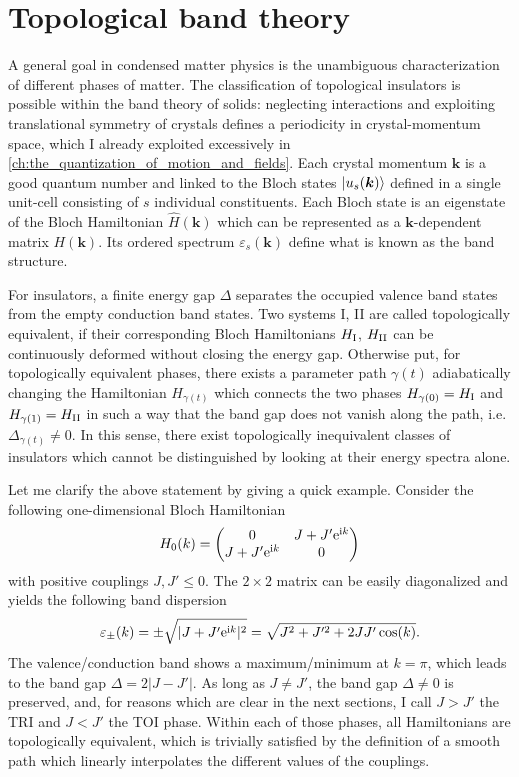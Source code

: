 \section{Topological band theory}
\label{sec:topological_band_theory}
%
%
A general goal in condensed matter physics is the unambiguous characterization of different phases of matter.
The classification of topological insulators is possible within the band theory of solids: neglecting interactions and exploiting translational symmetry of crystals defines a periodicity in crystal-momentum space, which I already exploited excessively in \cref{ch:the_quantization_of_motion_and_fields}.
Each crystal momentum ${\bm k}$ is a good quantum number and linked to the Bloch states $\ket{u_s(\bm k)}$ defined in a single unit-cell consisting of $s$ individual constituents.
Each Bloch state is an eigenstate of the Bloch Hamiltonian $\hat H(\bm k)$ which can be represented as a $\bm k$-dependent matrix $H(\bm k)$.
Its ordered spectrum $\varepsilon_s(\bm k)$ define what is known as the band structure.

For insulators, a finite energy gap $\Delta$ separates the occupied valence band states from the empty conduction band states.
Two systems I, II are called topologically equivalent, if their corresponding Bloch Hamiltonians $H_{\rm I}$, $H_{\rm II}$ can be continuously deformed without closing the energy gap.
Otherwise put, for topologically equivalent phases, there exists a parameter path $\gamma(t)$ adiabatically changing the Hamiltonian $H_{\gamma(t)}$ which connects the two phases $H_{\gamma(0)}=H_{\rm I}$ and $H_{\gamma(1)}=H_{\rm II}$ in such a way that the band gap does not vanish along the path, i.e. $\Delta_{\gamma(t)}\neq0$.
In this sense, there exist topologically inequivalent classes of insulators which cannot be distinguished by looking at their energy spectra alone.

Let me clarify the above statement by giving a quick example.
Consider the following one-dimensional Bloch Hamiltonian
\begin{align}
    H_0(k)
    =
    \begin{pmatrix}
        0 & J+J'\mathrm e^{\mathrm i k}\\
        J+J'\mathrm e^{\mathrm i k} & 0
    \end{pmatrix}
\end{align}
with positive couplings $J,J'\leq0$.
The $2\times2$ matrix can be easily diagonalized and yields the following band dispersion
\begin{align}
    \varepsilon_{\pm}(k) = \pm \sqrt{|J+J'\mathrm e^{\mathrm i k}|^2} = \sqrt{J^2+J'^2+2JJ'\cos(k)}.
\end{align}
The valence/conduction band shows a maximum/minimum at $k=\pi$, which leads to the band gap $\Delta = 2\left|J-J'\right|$.
As long as $J\neq J'$, the band gap $\Delta\neq0$ is preserved, and, for reasons which are clear in the next sections, I call $J>J'$ the TRI and $J<J'$ the TOI phase.
Within each of those phases, all Hamiltonians are topologically equivalent, which is trivially satisfied by the definition of a smooth path which linearly interpolates the different values of the couplings.

